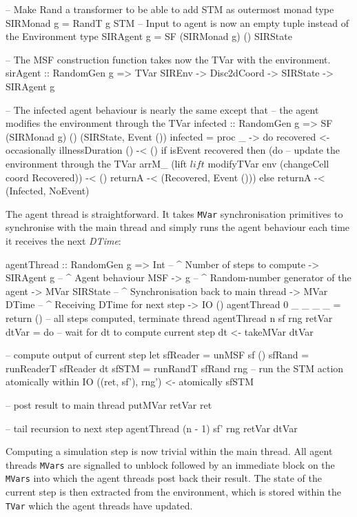 \begin{HaskellCode}
-- Make Rand a transformer to be able to add STM as outermost monad
type SIRMonad g = RandT g STM
-- Input to agent is now an empty tuple instead of the Environment
type SIRAgent g = SF (SIRMonad g) () SIRState

-- The MSF construction function takes now the TVar with the environment.
sirAgent :: RandomGen g => TVar SIREnv -> Disc2dCoord -> SIRState -> SIRAgent g

-- The infected agent behaviour is nearly the same except that
-- the agent modifies the environment through the TVar
infected :: RandomGen g => SF (SIRMonad g) () (SIRState, Event ())
infected = proc _ -> do
  recovered <- occasionally illnessDuration () -< ()
  if isEvent recovered
    then (do
      -- update the environment through the TVar
      arrM_ (lift $ lift $ modifyTVar env (changeCell coord Recovered)) -< ()
      returnA -< (Recovered, Event ()))
    else returnA -< (Infected, NoEvent)
\end{HaskellCode}

The agent thread is straightforward. It takes \texttt{MVar} synchronisation primitives to synchronise with the main thread and simply runs the agent behaviour each time it receives the next \textit{DTime}:

\begin{HaskellCode}
agentThread :: RandomGen g 
            => Int             -- ^ Number of steps to compute
            -> SIRAgent g      -- ^ Agent behaviour MSF
            -> g               -- ^ Random-number generator of the agent
            -> MVar SIRState   -- ^ Synchronisation back to main thread
            -> MVar DTime      -- ^ Receiving DTime for next step
            -> IO ()
agentThread 0 _ _ _ _ = return () -- all steps computed, terminate thread
agentThread n sf rng retVar dtVar = do
  -- wait for dt to compute current step
  dt <- takeMVar dtVar

  -- compute output of current step
  let sfReader = unMSF sf ()
      sfRand   = runReaderT sfReader dt
      sfSTM    = runRandT sfRand rng
  -- run the STM action atomically within IO
  ((ret, sf'), rng') <- atomically sfSTM 

  -- post result to main thread
  putMVar retVar ret
  
  -- tail recursion to next step 
  agentThread (n - 1) sf' rng retVar dtVar
\end{HaskellCode}

Computing a simulation step is now trivial within the main thread. All agent threads \texttt{MVars} are signalled to unblock followed by an immediate block on the \texttt{MVars} into which the agent threads post back their result. The state of the current step is then extracted from the environment, which is stored within the \texttt{TVar} which the agent threads have updated.

